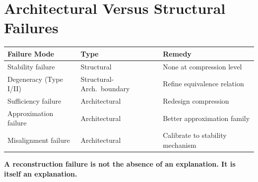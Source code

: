 \section{Architectural Versus Structural Failures}

\begin{center}\small
\begin{tabular}{lll}
\toprule
Failure Mode & Type & Remedy \\
\midrule
Stability failure & Structural & None at compression level \\
Degeneracy (Type I/II) & Structural-Arch.\ boundary & Refine equivalence relation \\
Sufficiency failure & Architectural & Redesign compression \\
Approximation failure & Architectural & Better approximation family \\
Misalignment failure & Architectural & Calibrate to stability mechanism \\
\bottomrule
\end{tabular}
\end{center}

\textbf{A reconstruction failure is not the absence of an explanation. It is itself an explanation.}
